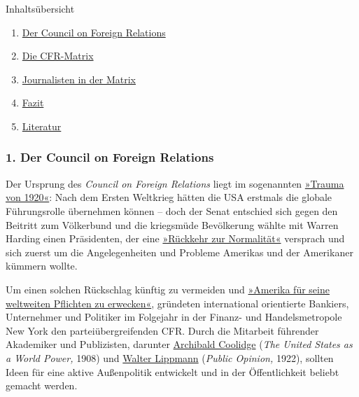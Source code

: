 Inhaltsübersicht

\begin{enumerate}
\def\labelenumi{\arabic{enumi}.}
\tightlist
\item
  \protect\hyperlink{k1}{Der Council on Foreign Relations}
\item
  \protect\hyperlink{k2}{Die CFR-Matrix}
\item
  \protect\hyperlink{k3}{Journalisten in der Matrix}
\item
  \protect\hyperlink{k4}{Fazit}
\item
  \protect\hyperlink{k5}{Literatur}
\end{enumerate}

\hypertarget{1-der-council-on-foreign-relations}{%
\subsubsection{1. Der Council on Foreign
Relations}\label{1-der-council-on-foreign-relations}}

Der Ursprung des \emph{Council on Foreign Relations} liegt im
sogenannten
\href{http://magazin.spiegel.de/EpubDelivery/spiegel/pdf/41389590}{»Trauma
von 1920«}: Nach dem Ersten Weltkrieg hätten die USA erstmals die
globale Führungsrolle übernehmen können -- doch der Senat entschied sich
gegen den Beitritt zum Völkerbund und die kriegsmüde Bevölkerung wählte
mit Warren Harding einen Präsidenten, der eine
\href{https://en.wikipedia.org/wiki/Return_to_normalcy}{»Rückkehr zur
Normalität«} versprach und sich zuerst um die Angelegen­heiten und
Probleme Amerikas und der Amerikaner kümmern wollte.

Um einen solchen Rückschlag künftig zu vermeiden und
\href{http://www.nytimes.com/1971/11/21/archives/is-it-a-club-seminar-presidium-invisible-government-the-council-on-.html}{»Amerika
für seine weltweiten Pflichten zu erwecken«}, gründeten international
orientierte Bankiers, Unternehmer und Politiker im Folgejahr in der
Finanz- und Handelsmetropole New York den parteiübergreifenden CFR.
Durch die Mitarbeit führender Akademiker und Publizisten, darunter
\href{https://en.wikipedia.org/wiki/Archibald_Cary_Coolidge}{Archibald
Coolidge} (\emph{The United States as a World Power,} 1908) und
\href{https://en.wikipedia.org/wiki/Walter_Lippmann}{Walter Lippmann}
(\emph{Public Opinion,} 1922), sollten Ideen für eine aktive
Außen­politik entwickelt und in der Öffentlichkeit beliebt gemacht
werden.

